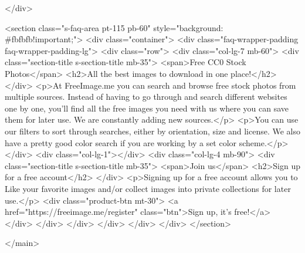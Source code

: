</div>

<section class="s-faq-area pt-115 pb-60" style="background: #fbfbfb!important;">
<div class="container">
<div class="faq-wrapper-padding faq-wrapper-padding-lg">
<div class="row">
<div class="col-lg-7 mb-60">
<div class="section-title s-section-title mb-35">
<span>Free CC0 Stock Photos</span>
<h2>All the best images to download in one place!</h2>
</div>
<p>At FreeImage.me you can search and browse free stock photos from multiple sources. Instead of having to go through and search different websites one by one, you'll find all the free images you need with us where you can save them for later use. We are constantly adding new sources.</p>
<p>You can use our filters to sort through searches, either by orientation, size and license. We also have a pretty good color search if you are working by a set color scheme.</p>
</div>
<div class="col-lg-1"></div>
<div class="col-lg-4 mb-90">
<div class="section-title s-section-title mb-35">
<span>Join us</span>
<h2>Sign up for a free account</h2>
</div>
<p>Signing up for a free account allows you to Like your favorite images and/or collect images into private collections for later use.</p>
<div class="product-btn mt-30">
<a href="https://freeimage.me/register" class="btn">Sign up, it's free!</a>
</div>
</div>
</div>
</div>
</div>
</div>
</section>

</main>


